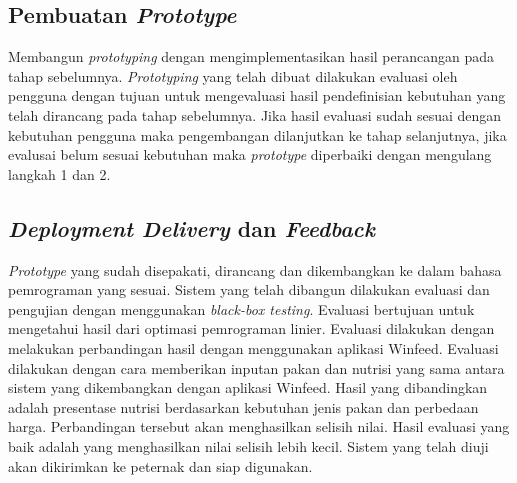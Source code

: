 \subsection*{Pembuatan \textit{Prototype}}

Membangun \textit{prototyping} dengan mengimplementasikan hasil perancangan pada tahap sebelumnya. \textit{Prototyping} yang telah dibuat dilakukan evaluasi oleh pengguna dengan tujuan untuk mengevaluasi hasil pendefinisian kebutuhan yang telah dirancang pada tahap sebelumnya. Jika hasil evaluasi sudah sesuai dengan kebutuhan pengguna maka pengembangan dilanjutkan ke tahap selanjutnya, jika evalusai belum sesuai kebutuhan maka \textit{prototype} diperbaiki dengan mengulang langkah 1 dan 2. 

\subsection*{\textit{Deployment Delivery} dan \textit{Feedback}}

\textit{Prototype} yang sudah disepakati, dirancang dan dikembangkan ke dalam bahasa pemrograman yang sesuai. Sistem yang telah dibangun dilakukan evaluasi dan pengujian dengan menggunakan \textit{black-box testing}. Evaluasi bertujuan untuk mengetahui hasil dari optimasi pemrograman linier. Evaluasi dilakukan dengan melakukan perbandingan hasil dengan menggunakan aplikasi Winfeed. Evaluasi dilakukan dengan cara memberikan inputan pakan dan nutrisi yang sama antara sistem yang dikembangkan dengan aplikasi Winfeed. Hasil yang dibandingkan adalah presentase nutrisi berdasarkan kebutuhan jenis pakan dan perbedaan harga. Perbandingan tersebut akan menghasilkan selisih nilai. Hasil evaluasi yang baik adalah yang menghasilkan nilai selisih lebih kecil. Sistem yang telah diuji akan dikirimkan ke peternak dan siap digunakan.
